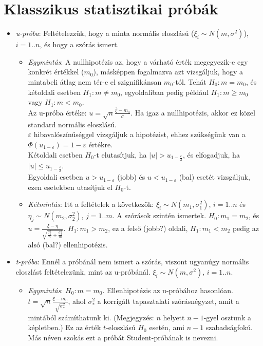 \documentclass[margin=0px]{article}
\begin{document}
	\section{Klasszikus statisztikai próbák}
	
	\begin{itemize}
		\item \textit{u-próba}: Feltételezzük, hogy a minta normális eloszlású ($\xi_i \sim N(m, \sigma^2)$), $i=1..n$, és hogy a szórás ismert.
			\begin{itemize}
				\item \textit{Egymintás}: A nullhipotézis az, hogy a várható érték megegyezik-e egy konkrét értékkel ($m_0$), másképpen fogalmazva azt vizsgáljuk, hogy a mintabeli átlag nem tér-e el szignifikánsan $m_0$-tól. Tehát $H_0: m = m_0$, és kétoldali esetben $H_1: m \neq m_0$, egyoldaliban pedig például $H_1: m \geq m_0$ vagy $H_1: m < m_0$. \\
				Az u-próba értéke: $u = \sqrt{n}\frac{\overline{\xi} - m_0}{\sigma}$. Ha igaz a nullhipotézis, akkor ez közel standard normális eloszlású. \\
				$\varepsilon$ hibavalószínűséggel vizsgáljuk a hipotézist, ehhez szükségünk van a $\Phi(u_{1-\varepsilon}) = 1 - \varepsilon$ értékre. \\
				Kétoldali esetben $H_0$-t elutasítjuk, ha $|u| > u_{1-\frac{\varepsilon}{2}}$, és elfogadjuk, ha $|u| \leq u_{1-\frac{\varepsilon}{2}}$. \\
				Egyoldali esetben $u > u_{1-\varepsilon}$ (jobb) és $u < u_{1-\varepsilon}$ (bal) esetét vizsgáljuk, ezen esetekben utasítjuk el $H_0$-t.
				\item \textit{Kétmintás}: Itt a feltételek a következők: $\xi_i \sim N(m_1, \sigma_1^2)$, $i=1..n$ és $\eta_j \sim N(m_2, \sigma_2^2)$, $j=1..m$. A szórások szintén ismertek. $H_0: m_1 = m_2$, és $u = \frac{\overline{\xi} - \overline{\eta}}{\sqrt{\frac{\sigma_1^2}{n} + \frac{\sigma_2^2}{m}}}$. $H_1 : m_1 > m_2$, ez a felső (jobb?) oldali, $H_1 : m_1 < m_2$ pedig az alsó (bal?) ellenhipotézis.
			\end{itemize}
		\item \textit{t-próba}:	Ennél a próbánál nem ismert a szórás, viszont ugyanúgy normális eloszlást feltételezünk, mint az u-próbánál. $\xi_i \sim N(m, \sigma^2)$, $i=1..n$.
			\begin{itemize}
				\item \textit{Egymintás}: $H_0: m = m_0$. Ellenhipotézis az u-próbához hasonlóan. $t = \sqrt{n}\frac{\overline{\xi} - m_0}{\sqrt{\sigma_{*}^2}}$, ahol $\sigma_{*}^2$ a korrigált tapasztalati szórásnégyzet, amit a mintából számíthatunk ki. (Megjegyzés: $n$ helyett $n-1$-gyel osztunk a képletben.) Ez az érték $t$-eloszlású $H_0$ esetén, ami $n-1$ szabadságfokú. Más néven szokás ezt a próbát Student-próbának is nevezni. 

\end{itemize}
\end{itemize}
\end{document}
